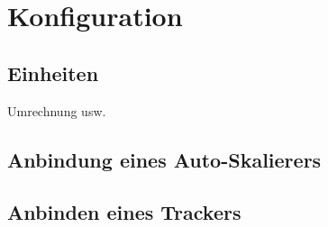 \chapter{Konfiguration}
\label{ch:Konfiguration}

\section{Einheiten}
Umrechnung usw.


\section{Anbindung eines Auto-Skalierers}
\label{sec:Konfiguration:AnbindungScaler}

\section{Anbinden eines Trackers}



